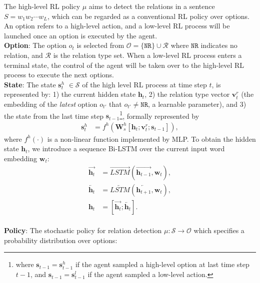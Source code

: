 \documentclass[letterpaper]{article}
\theoremstyle{definition}
\begin{document}
The high-level RL policy $\mu$ aims to detect the relations in a sentence $S = w_1 w_2 \cdots w_L$, which can be regarded as a conventional RL policy over options. An option refers to a high-level action, and a low-level RL process will be launched once an option is executed by the agent.
\\
\textbf{Option}: The option $o_t$ is selected from $\mathcal{O} = \{ \texttt{NR} \} \cup \mathcal{R}$ where $\texttt{NR}$ indicates no relation, and $\mathcal{R}$ is the relation type set. When a low-level RL process enters a terminal state, the control of the agent will be taken over to the high-level RL process to execute the next options.
\\
\textbf{State}: The state $\mathbf{s}_t^h$ $\in \mathcal{S}$ of the high level RL process at time step $t$, is represented by: 1) the current hidden state $\mathbf{h}_t$, 2) the relation type vector $\mathbf{v}_t^r$ (the embedding of the \textit{latest} option $o_{t'}$ that $o_{t'} \not= \texttt{NR}$, a learnable parameter), and 3) the state from the last time step $\mathbf{s}_{t-1}$\footnote{where $\mathbf{s}_{t-1} = \mathbf{s}_{t-1}^h$ if the agent sampled a high-level option at last time step $t-1$, and $\mathbf{s}_{t-1} = \mathbf{s}_{t-1}^l$ if the agent sampled a low-level action.}, formally represented by
\begin{equation}\label{state_high}
    \begin{split}
        \mathbf{s}_t^h &= f^h(\mathbf{W}_s^h [ \mathbf{h}_t ; \mathbf{v}_t^r ; \mathbf{s}_{t-1}]),
    \end{split}
\end{equation}
where $f^h(\cdot)$ is a non-linear function implemented by MLP. To obtain the hidden state $\mathbf{h}_t$, we introduce a sequence Bi-LSTM over the current input word embedding $\mathbf{w}_t$:
\begin{equation}\label{LSTM}
    \begin{split}
        \overrightarrow{\mathbf{h}_t} &= \overrightarrow{LSTM}(\overrightarrow{\mathbf{h}_{t-1}}, \mathbf{w}_t), \\
        \overleftarrow{\mathbf{h}_t} &= \overleftarrow{LSTM}(\overleftarrow{\mathbf{h}_{t+1}}, \mathbf{w}_t), \\
        \mathbf{h}_t &= [ \overrightarrow{\mathbf{h}_t} ; \overleftarrow{\mathbf{h}_t} ].
    \end{split}
\end{equation}
\\
\textbf{Policy}: The stochastic policy for relation detection $\mu: \mathcal{S} \to \mathcal{O}$ which specifies a probability distribution over options:
\end{document}
